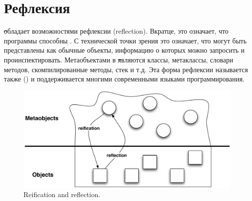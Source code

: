 \documentclass[a4paper,10pt,twoside]{book}
\begin{document}
	\sloppy
\fi

\chapter{Рефлексия}


\st обладает возможностями рефлексии (reflection).
Вкратце, это означает, что программы способны .
С технической точки зрения это означает, что   могут быть представлены как обычные объекты, информацию о которых можно запросить и проинспектировать.
Метаобъектами в \st являются классы, метаклассы, словари методов, скомпилированные методы, стек  и т.д.
Эта форма рефлексии называется также  () и поддерживается многими современными языками программирования.


\begin{figure}[ht]\centering
	\includegraphics[width=\linewidth]{reflect}
	\caption{Reification and reflection.} %
\end{figure}
\end{document}
